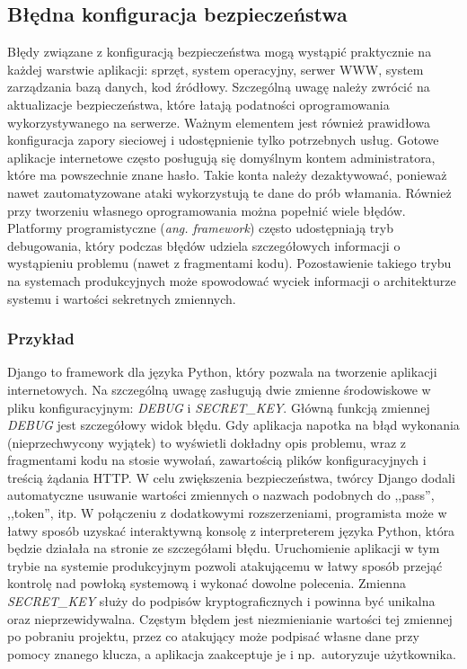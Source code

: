 \documentclass[11pt,a4paper,polish,thesis,oneside]{dcsbook}
\begin{document}
\subsection{Błędna konfiguracja bezpieczeństwa}
Błędy związane z konfiguracją bezpieczeństwa mogą wystąpić praktycznie na każdej warstwie aplikacji: sprzęt, system operacyjny, serwer WWW, system zarządzania bazą danych, kod źródłowy. Szczególną uwagę należy zwrócić na aktualizacje bezpieczeństwa, które łatają podatności oprogramowania wykorzystywanego na serwerze. Ważnym elementem jest również prawidłowa konfiguracja zapory sieciowej i udostępnienie tylko potrzebnych usług. Gotowe aplikacje internetowe często posługują się domyślnym kontem administratora, które ma powszechnie znane hasło. Takie konta należy dezaktywować, ponieważ nawet zautomatyzowane ataki wykorzystują te dane do prób włamania. Również przy tworzeniu własnego oprogramowania można popełnić wiele błędów. Platformy programistyczne (\textit{ang. framework}) często udostępniają tryb debugowania, który podczas błędów udziela szczegółowych informacji o wystąpieniu problemu (nawet z fragmentami kodu). Pozostawienie takiego trybu na systemach produkcyjnych może spowodować wyciek informacji o architekturze systemu i wartości sekretnych zmiennych.

\subsubsection*{Przykład}
Django \cite{django} to framework dla języka Python, który pozwala na tworzenie aplikacji internetowych. Na szczególną uwagę zasługują dwie zmienne środowiskowe w pliku konfiguracyjnym: \textit{DEBUG} i \textit{SECRET\_KEY}. Główną funkcją zmiennej \textit{DEBUG} jest szczegółowy widok błędu. Gdy aplikacja napotka na błąd wykonania (nieprzechwycony wyjątek) to wyświetli dokładny opis problemu, wraz z fragmentami kodu na stosie wywołań, zawartością plików konfiguracyjnych i treścią żądania HTTP. W celu zwiększenia bezpieczeństwa, twórcy Django dodali automatyczne usuwanie wartości zmiennych o nazwach podobnych do ,,pass'', ,,token'', itp. W połączeniu z dodatkowymi rozszerzeniami, programista może w łatwy sposób uzyskać interaktywną konsolę z interpreterem języka Python, która będzie działała na stronie ze szczegółami błędu. Uruchomienie aplikacji w tym trybie na systemie produkcyjnym pozwoli atakującemu w łatwy sposób przejąć kontrolę nad powłoką systemową i wykonać dowolne polecenia. Zmienna \textit{SECRET\_KEY} służy do podpisów kryptograficznych i powinna być unikalna oraz nieprzewidywalna. Częstym błędem jest niezmienianie wartości tej zmiennej po pobraniu projektu, przez co atakujący może podpisać własne dane przy pomocy znanego klucza, a aplikacja zaakceptuje je i np.~autoryzuje użytkownika.
\end{document}
